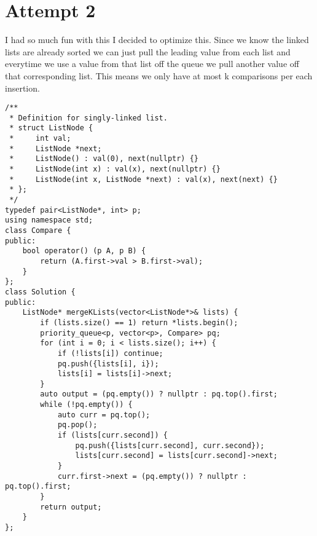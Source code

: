 \section{Attempt 2}
I had so much fun with this I decided to optimize this. Since we know the linked lists are already sorted
we can just pull the leading value from each list and everytime we use a value from that list off the 
queue we pull another value off that corresponding list. This means we only have at most k comparisons
per each insertion.
\begin{lstlisting}
/**
 * Definition for singly-linked list.
 * struct ListNode {
 *     int val;
 *     ListNode *next;
 *     ListNode() : val(0), next(nullptr) {}
 *     ListNode(int x) : val(x), next(nullptr) {}
 *     ListNode(int x, ListNode *next) : val(x), next(next) {}
 * };
 */
typedef pair<ListNode*, int> p;
using namespace std;
class Compare {
public:
    bool operator() (p A, p B) {
        return (A.first->val > B.first->val);
    }    
};
class Solution {
public:
    ListNode* mergeKLists(vector<ListNode*>& lists) {
        if (lists.size() == 1) return *lists.begin();
        priority_queue<p, vector<p>, Compare> pq;
        for (int i = 0; i < lists.size(); i++) {
            if (!lists[i]) continue;
            pq.push({lists[i], i});
            lists[i] = lists[i]->next;
        }
        auto output = (pq.empty()) ? nullptr : pq.top().first;
        while (!pq.empty()) {
            auto curr = pq.top();
            pq.pop();
            if (lists[curr.second]) {
                pq.push({lists[curr.second], curr.second});
                lists[curr.second] = lists[curr.second]->next;
            }
            curr.first->next = (pq.empty()) ? nullptr : pq.top().first;
        }
        return output;
    }
};

\end{lstlisting}
